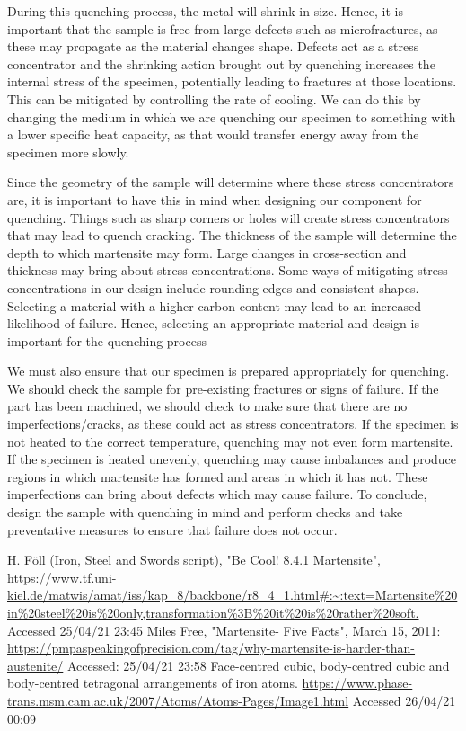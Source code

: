 \documentclass[11pt]{article}
\begin{document}
During this quenching process, the metal will shrink in size. Hence, it is important that the sample is free from large defects such as microfractures, as these may propagate as the material changes shape. Defects act as a stress concentrator and the shrinking action brought out by quenching increases the internal stress of the specimen, potentially leading to fractures at those locations. This can be mitigated by controlling the rate of cooling. We can do this by changing the medium in which we are quenching our specimen to something with a lower specific heat capacity, as that would transfer energy away from the specimen more slowly. 

Since the geometry of the sample will determine where these stress concentrators are, it is important to have this in mind when designing our component for quenching. Things such as sharp corners or holes will create stress concentrators that may lead to quench cracking. The thickness of the sample will determine the depth to which martensite may form. Large changes in cross-section and thickness may bring about stress concentrations. Some ways of mitigating stress concentrations in our design include rounding edges and consistent shapes. Selecting a material with a higher carbon content may lead to an increased likelihood of failure. Hence, selecting an appropriate material and design is important for the quenching process

We must also ensure that our specimen is prepared appropriately for quenching. We should check the sample for pre-existing fractures or signs of failure. If the part has been machined, we should check to make sure that there are no imperfections/cracks, as these could act as stress concentrators. If the specimen is not heated to the correct temperature, quenching may not even form martensite. If the specimen is heated unevenly, quenching may cause imbalances and produce regions in which martensite has formed and areas in which it has not. These imperfections can bring about defects which may cause failure. To conclude, design the sample with quenching in mind and perform checks and take preventative measures to ensure that failure does not occur.
\begin{thebibliography}{00}
     H. Föll (Iron, Steel and Swords script), "Be Cool! 8.4.1 Martensite", \url{https://www.tf.uni-kiel.de/matwis/amat/iss/kap_8/backbone/r8_4_1.html#:~:text=Martensite%20in%20steel%20is%20only,transformation%3B%20it%20is%20rather%20soft.} Accessed 25/04/21 23:45
     Miles Free, "Martensite- Five Facts", March 15, 2011: \url{https://pmpaspeakingofprecision.com/tag/why-martensite-is-harder-than-austenite/} Accessed: 25/04/21 23:58
     Face-centred cubic, body-centred cubic and body-centred tetragonal arrangements of iron atoms. \url{https://www.phase-trans.msm.cam.ac.uk/2007/Atoms/Atoms-Pages/Image1.html} Accessed 26/04/21 00:09
\end{thebibliography}
\end{document}
